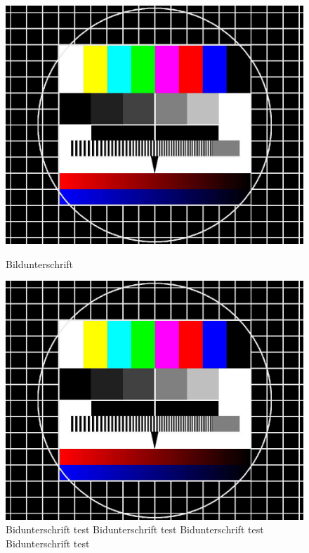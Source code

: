 \begin{figure}[h]
	\centering
	\begin{minipage}[t]{0.48\textwidth}
		\includegraphics[width=\textwidth]{bilder/identifikation/testbild}
		\caption{Bildunterschrift}
		\label{fig:}
	\end{minipage}
	\hfill
	\begin{minipage}[t]{0.48\textwidth}
		\includegraphics[width=\textwidth]{bilder/identifikation/testbild}
		\caption{Bidunterschrift test Bidunterschrift test Bidunterschrift test Bidunterschrift test }
		\label{fig:}
	\end{minipage}
\end{figure}
























